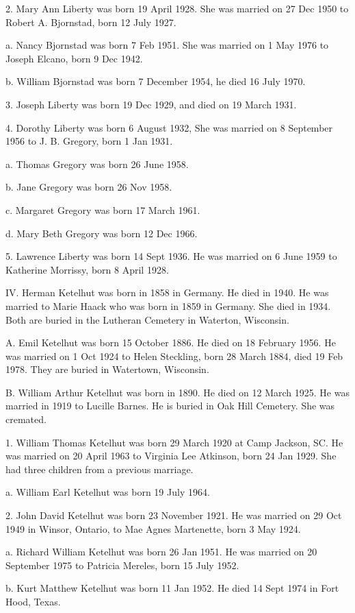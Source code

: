 \documentclass[a4paper]{article}
\begin{document}
2. Mary Ann Liberty was born 19 April 1928.  She was married on 27 Dec 1950 to Robert A. Bjornstad, born 12 July 1927.

a. Nancy Bjornstad was born 7 Feb 1951.  She was married on 1 May 1976 to Joseph Elcano, born 9 Dec 1942.

b. William Bjornstad was born 7 December 1954, he died 16 July 1970.

3. Joseph Liberty was born 19 Dec 1929, and died on 19 March 1931.

4. Dorothy Liberty was born 6 August 1932,  She was married on 8 September 1956 to J. B. Gregory, born 1 Jan 1931.

a. Thomas Gregory was born 26 June 1958.

b. Jane Gregory was born 26 Nov 1958.

c. Margaret Gregory was born 17 March 1961.

d. Mary Beth Gregory was born 12 Dec 1966.

5. Lawrence Liberty was born 14 Sept 1936.  He was married on 6 June 1959 to Katherine Morrissy, born 8 April 1928.

IV. Herman Ketelhut was born in 1858 in Germany.  He died in 1940.  He was married to Marie Haack who was born in 1859 in Germany.  She died in 1934.  Both are buried in the Lutheran Cemetery in Waterton, Wisconsin.

A. Emil  Ketelhut was born 15 October 1886.  He died on 18 February 1956.  He was married on 1 Oct 1924 to Helen Steckling, born 28 March 1884, died 19 Feb 1978. They are buried in Watertown, Wisconsin.

B. William Arthur Ketelhut was born in 1890.  He died on 12 March 1925.  He was married in 1919 to Lucille Barnes.  He is buried in Oak Hill Cemetery.  She was cremated.

1. William Thomas Ketelhut was born 29 March 1920 at Camp Jackson, SC.  He was married on 20 April 1963 to Virginia Lee Atkinson, born 24 Jan 1929.  She had three children from a previous marriage.  

a. William Earl Ketelhut was born 19 July 1964.

2. John David Ketelhut was born 23 November 1921.  He was married on 29 Oct 1949 in Winsor, Ontario, to Mae Agnes Martenette, born 3 May 1924.

a. Richard William Ketelhut was born 26 Jan 1951.  He was married on 20 September 1975 to Patricia Mereles, born 15 July 1952.

b. Kurt Matthew Ketelhut was born 11 Jan 1952.  He died 14 Sept 1974 in Fort Hood, Texas.  
\end{document}
